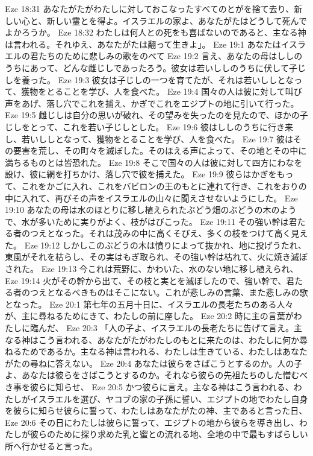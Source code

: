 Eze 18:31  あなたがたがわたしに対しておこなったすべてのとがを捨て去り、新しい心と、新しい霊とを得よ。イスラエルの家よ、あなたがたはどうして死んでよかろうか。
Eze 18:32  わたしは何人との死をも喜ばないのであると、主なる神は言われる。それゆえ、あなたがたは翻って生きよ」。
Eze 19:1  あなたはイスラエルの君たちのために悲しみの歌をのべて
Eze 19:2  言え、あなたの母はししのうちにあって、どんな雌じしであったろう。彼女は若いししのうちに伏して子じしを養った。
Eze 19:3  彼女は子じしの一つを育てたが、それは若いししとなって、獲物をとることを学び、人を食べた。
Eze 19:4  国々の人は彼に対して叫び声をあげ、落し穴でこれを捕え、かぎでこれをエジプトの地に引いて行った。
Eze 19:5  雌じしは自分の思いが破れ、その望みを失ったのを見たので、ほかの子じしをとって、これを若い子じしとした。
Eze 19:6  彼はししのうちに行き来し、若いししとなって、獲物をとることを学び、人を食べた。
Eze 19:7  彼はその要害を荒し、その町々を滅ぼした。そのほえる声によって、その地とその中に満ちるものとは皆恐れた。
Eze 19:8  そこで国々の人は彼に対して四方にわなを設け、彼に網を打ちかけ、落し穴で彼を捕えた。
Eze 19:9  彼らはかぎをもって、これをかごに入れ、これをバビロンの王のもとに連れて行き、これをおりの中に入れて、再びその声をイスラエルの山々に聞えさせないようにした。
Eze 19:10  あなたの母は水のほとりに移し植えられたぶどう畑のぶどうの木のようで、水が多いために実りがよく、枝がはびこった。
Eze 19:11  その強い幹は君たる者のつえとなった。それは茂みの中に高くそびえ、多くの枝をつけて高く見えた。
Eze 19:12  しかしこのぶどうの木は憤りによって抜かれ、地に投げうたれ、東風がそれを枯らし、その実はもぎ取られ、その強い幹は枯れて、火に焼き滅ぼされた。
Eze 19:13  今これは荒野に、かわいた、水のない地に移し植えられ、
Eze 19:14  火がその幹から出て、その枝と実とを滅ぼしたので、強い幹で、君たる者のつえとなるべきものはそこにない。これが悲しみの言葉、また悲しみの歌となった。
Eze 20:1  第七年の五月十日に、イスラエルの長老たちのある人々が、主に尋ねるためにきて、わたしの前に座した。
Eze 20:2  時に主の言葉がわたしに臨んだ、
Eze 20:3  「人の子よ、イスラエルの長老たちに告げて言え。主なる神はこう言われる、あなたがたがわたしのもとに来たのは、わたしに何か尋ねるためであるか。主なる神は言われる、わたしは生きている、わたしはあなたがたの尋ねに答えない。
Eze 20:4  あなたは彼らをさばこうとするのか。人の子よ、あなたは彼らをさばこうとするのか。それなら彼らの先祖たちのした憎むべき事を彼らに知らせ、
Eze 20:5  かつ彼らに言え。主なる神はこう言われる、わたしがイスラエルを選び、ヤコブの家の子孫に誓い、エジプトの地でわたし自身を彼らに知らせ彼らに誓って、わたしはあなたがたの神、主であると言った日、
Eze 20:6  その日にわたしは彼らに誓って、エジプトの地から彼らを導き出し、わたしが彼らのために探り求めた乳と蜜との流れる地、全地の中で最もすばらしい所へ行かせると言った。
